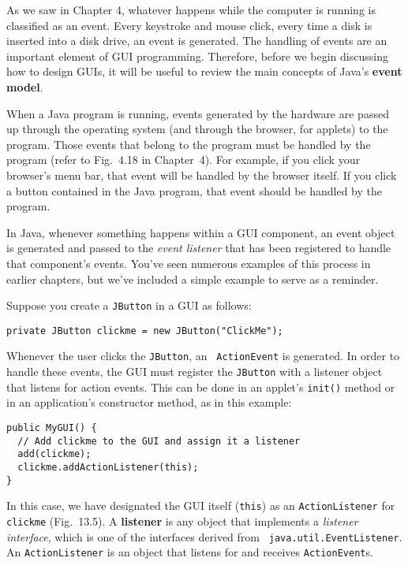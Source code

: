 \noindent As we saw in Chapter 4, whatever happens while the computer
is running is classified as an event.  Every keystroke and mouse
click, every time a disk is inserted into a disk drive, an event is
generated.  The handling of events are an important element of GUI
programming. Therefore, before we begin discussing how to design GUIs,
it will be useful to review the main concepts of Java's {\bf event
model}.

When a Java program is running, events generated by the hardware are
passed up through the operating system (and through the browser, for
applets) to the program.  Those events that belong to the program must
be handled by the program (refer to Fig.~4.18 in
Chapter~4). For example, if you click your browser's menu bar, that
event will be handled by the browser itself.  If you click a button
contained in the Java program, that event should be handled by the
program.

In Java, whenever something happens within a GUI component, an event
object is generated and passed to the {\it event listener} that has
been registered to handle that component's events.  You've seen
numerous examples of this process in earlier chapters, but we've
included a simple example to serve as a reminder.

Suppose you create a {\tt JButton} in a GUI as follows:

\begin{jjjlisting}
\begin{lstlisting}
private JButton clickme = new JButton("ClickMe");
\end{lstlisting}
\end{jjjlisting}

\noindent Whenever the user clicks the {\tt JButton}, an {\tt
ActionEvent} is generated.  In order to handle these events, the GUI
must register the {\tt JButton} with a listener object that listens
for action events.  This can be done in an applet's {\tt init()}
method or in an application's constructor method, as in this example:

\begin{jjjlisting}
\begin{lstlisting}
public MyGUI() {
  // Add clickme to the GUI and assign it a listener
  add(clickme);  
  clickme.addActionListener(this); 
}
\end{lstlisting}
\end{jjjlisting}

\noindent In this case, we have designated the GUI itself ({\tt this})
as an {\tt ActionListener} for {\tt clickme} (Fig.~13.5).
A {\bf listener} is any object that implements a {\it listener
interface}, which is one of the interfaces derived from {\tt
java.util.Event\-Listener}.  An {\tt ActionListener} is an object that
listens for and receives {\tt ActionEvent}s.

